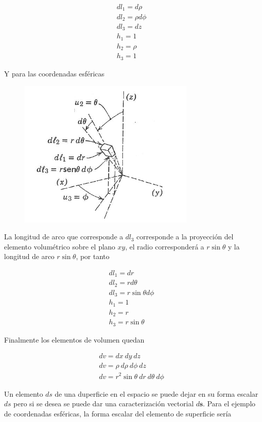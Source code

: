 \begin{eqnarray*}
dl_1 = d\rho \\
dl_2 = \rho d\phi \\
dl_3 = dz \\
h_1 = 1 \\
h_2 = \rho \\
h_3 = 1
\end{eqnarray*}

Y para las coordenadas esféricas 
\begin{figure}[H]
    \centering
    \includegraphics{Waves/waves_f3.png}
\end{figure}

La longitud de arco que corresponde a $dl_3$ corresponde a la proyección del elemento volumétrico sobre el plano $xy$, el radio corresponderá a $r \sin \theta$ y la longitud de arco $r \sin \theta$, por tanto 

\begin{eqnarray*}
dl_1 = d r \\
dl_2 = r d\theta \\
dl_3 = r \sin \theta d \phi \\
h_1 = 1 \\
h_2 = r \\
h_3 = r \sin \theta
\end{eqnarray*}

Finalmente los elementos de volumen quedan

\begin{eqnarray*}
dv = dx \ dy \ dz \\
dv = \rho \ d\rho \ d \phi \ d z \\
dv = r^2 \sin \theta \ dr \ d \theta \ d \phi
\end{eqnarray*}

Un elemento $ds$ de una duperficie en el espacio se puede dejar en su forma escalar $ds$ pero si se desea se puede dar una caracterización vectorial $d \mathbf{s}$. Para el ejemplo de coordenadas esféricas, la forma escalar del elemento de superficie sería

